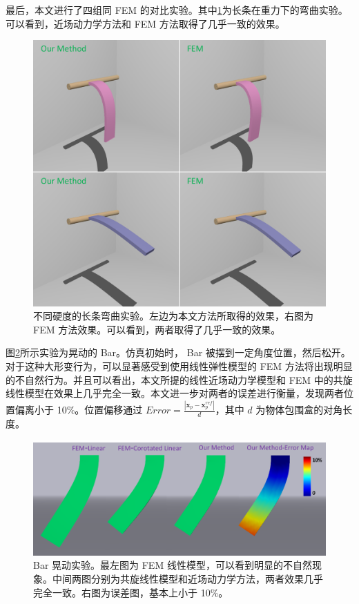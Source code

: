 最后，本文进行了四组同 FEM 的对比实验。其中\ref{demo_strip_vs_fem}为长条在重力下的弯曲实验。可以看到，近场动力学方法和 FEM 方法取得了几乎一致的效果。

\begin{figure}[!htb]
  \centering
  \captionsetup{justification=centering}
  \includegraphics[width=0.7\linewidth]{chap/image/demo_strip_vs_fem}

  \caption{\label{demo_strip_vs_fem}
           不同硬度的长条弯曲实验。左边为本文方法所取得的效果，右图为 FEM 方法效果。可以看到，两者取得了几乎一致的效果。
          }
\end{figure}

图\ref{demo_bar_oscillate_vs_fem}所示实验为晃动的 Bar。仿真初始时， Bar 被摆到一定角度位置，然后松开。对于这种大形变行为，可以显著感受到使用线性弹性模型的 FEM 方法将出现明显的不自然行为。并且可以看出，本文所提的线性近场动力学模型和 FEM 中的共旋线性模型在效果上几乎完全一致。本文进一步对两者的误差进行衡量，发现两者位置偏离小于 10\%。位置偏移通过 $Error = \frac{|\bm{x}_p-\bm{x}_p^{ref}|}{d}$，其中 $d$ 为物体包围盒的对角长度。

\begin{figure}[!htb]
  \centering
  \captionsetup{justification=centering}
  \includegraphics[width=0.9\linewidth]{chap/image/demo_bar_oscillate_vs_fem}

  \caption{\label{demo_bar_oscillate_vs_fem}
           Bar 晃动实验。最左图为 FEM 线性模型，可以看到明显的不自然现象。中间两图分别为共旋线性模型和近场动力学方法，两者效果几乎完全一致。右图为误差图，基本上小于 10\%。
          }
\end{figure}

